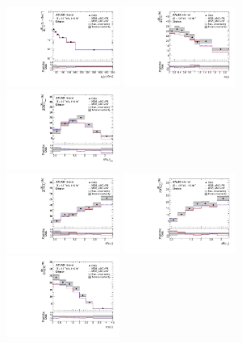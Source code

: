 \begin{figure}[ht]
  \centering
  \includegraphics[width=0.33\textwidth]{figures/diff_xsec/absolute-unfolded-distributions/tty_prod_dilep/DL_tty_prod_pt_unfolded_absolute.pdf}%
  \includegraphics[width=0.33\textwidth]{figures/diff_xsec/absolute-unfolded-distributions/tty_prod_dilep/DL_tty_prod_eta_unfolded_absolute.pdf}%
  \includegraphics[width=0.33\textwidth]{figures/diff_xsec/absolute-unfolded-distributions/tty_prod_dilep/DL_tty_prod_drphl_unfolded_absolute.pdf}\\
  \includegraphics[width=0.33\textwidth]{figures/diff_xsec/absolute-unfolded-distributions/tty_prod_dilep/DL_tty_prod_drphl1_unfolded_absolute.pdf}%
  \includegraphics[width=0.33\textwidth]{figures/diff_xsec/absolute-unfolded-distributions/tty_prod_dilep/DL_tty_prod_drphl2_unfolded_absolute.pdf}%
  \includegraphics[width=0.33\textwidth]{figures/diff_xsec/absolute-unfolded-distributions/tty_prod_dilep/DL_tty_prod_dEtall_unfolded_absolute.pdf}%

\end{figure}
